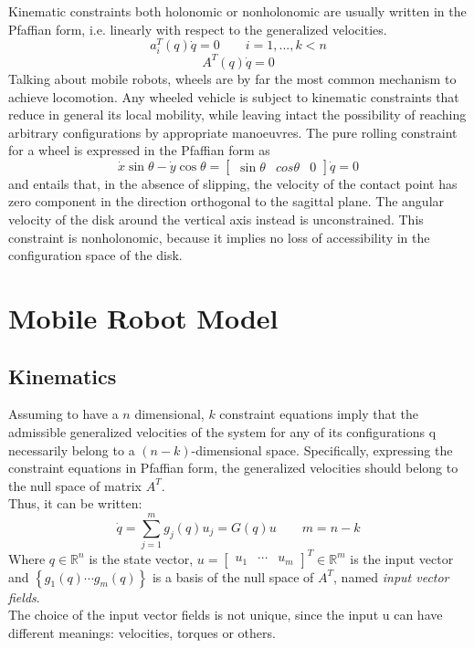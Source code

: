 Kinematic constraints both holonomic or nonholonomic are usually written in the Pfaffian form, i.e. linearly with respect to the generalized velocities.
\begin{equation}
a_i^T \left( q \right)\dot{q} =0 \qquad i=1,...,k<n 
\end{equation}
\begin{equation*} 
A^T \left( q \right)\dot{q} =0  
\end{equation*}
Talking about mobile robots, wheels are by far the most common mechanism to achieve locomotion. Any wheeled vehicle is subject to kinematic constraints that reduce in general its local mobility, while leaving intact the possibility of reaching arbitrary configurations by appropriate manoeuvres.
The pure rolling constraint for a wheel is expressed in the Pfaffian form as 
\begin{equation} 
\dot{x}\sin\theta-\dot{y}\cos\theta=\left[
\begin{matrix}
\sin\theta & cos\theta & 0
\end{matrix}
\right] \dot{q}=0
\end{equation}
and entails that, in the absence of slipping, the velocity of the contact point has zero component in the direction orthogonal to the sagittal plane. The angular velocity of the disk around the vertical axis instead is unconstrained.
This constraint is nonholonomic, because it implies no loss of accessibility in the configuration space of the disk.

\section{Mobile Robot Model}
\subsection{Kinematics}
Assuming to have a $n$ dimensional, $k$ constraint equations imply that the admissible generalized velocities of the system for any of its configurations q necessarily belong to a $(n-k)$-dimensional space. Specifically, expressing the constraint equations in Pfaffian form, the generalized velocities should belong to the null space of matrix $A^T$.\\
Thus, it can be written:
\begin{equation} \label{G}
\dot{q}=\sum_{j=1}^{m} g_j(q)u_j=G(q)u \qquad m=n-k
\end{equation}
Where $q\in \mathbb{R}^n $ is the state vector, $u= \left[
\begin{matrix}
u_1 &  \cdots & u_m
\end{matrix}
\right]^T\in\mathbb{R}^m $ is the input vector and $\left\lbrace  g_1 (q) \cdots g_m (q) \right\rbrace $ is a basis of the null space of $A^T$, named \textit{input vector fields}. \\
The choice of the input vector fields is not unique, since the input u can have different meanings: velocities, torques or others.

